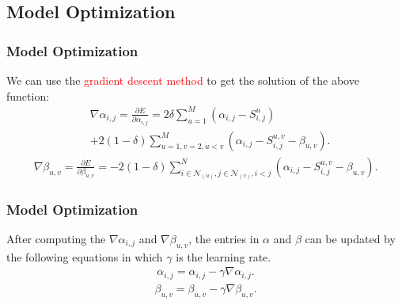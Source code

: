 \documentclass{beamer}
\newcommand{\red}[1]{\textcolor{red}{#1}}%
\begin{document}
\subsection{Model Optimization}
\begin{frame}
\frametitle{Model Optimization}

We can use the \red{gradient descent method} to get the solution of the above function:
\begin{equation}
\begin{aligned}\label{eq:gd_alpha}
   & \nabla \alpha_{i,j} = \frac{\partial E} {\partial \alpha_{i,j}} =2 \delta \sum^M_{u=1}(\alpha_{i,j}-S^u_{i,j}) \\
   & + 2(1-\delta) \sum^M_{u=1,{v=2},u<v}(\alpha_{i,j} - S^{u,v}_{i,j}-\beta_{u,v}).
\end{aligned}
\end{equation}
\begin{equation}
\begin{aligned}\label{gd_beta}
    \nabla \beta_{u,v} = \frac{\partial E} {\partial \beta_{u,v}} = - 2(1-\delta) \sum^N_{i \in \mathcal{N}_(u), j \in \mathcal{N}_(v), i<j}(\alpha_{i,j} - S^{u,v}_{i,j}-\beta_{u,v}).
\end{aligned}
\end{equation}
\vskip 0.2in

\end{frame}

\begin{frame}
\frametitle{Model Optimization}
After computing the $\nabla \alpha_{i,j}$ and $\nabla \beta_{u,v}$, the entries in $\alpha$ and $\beta$ can be updated by the following equations {in which} $\gamma$ is the learning rate.
\vskip 0.2in
\begin{equation}
\begin{aligned}\label{update_alpha}
   \alpha_{i,j} = \alpha_{i,j} - \gamma \nabla \alpha_{i,j}.
\end{aligned}
\end{equation}
\begin{equation}
\begin{aligned}\label{update_beta}
   \beta_{u,v} = \beta_{u,v} - \gamma \nabla \beta_{u,v}.
\end{aligned}
\end{equation}
\end{frame}
\end{document}
